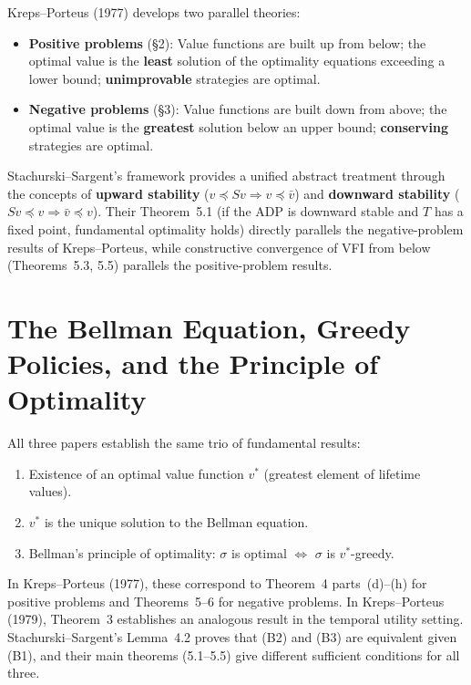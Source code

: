 \documentclass[12pt]{article}
\begin{document}
Kreps--Porteus (1977) develops two parallel theories:
\begin{itemize}
\item \textbf{Positive problems} (\S2): Value functions are built up from below; the optimal value is the \textbf{least} solution of the optimality equations exceeding a lower bound; \textbf{unimprovable} strategies are optimal.

\item \textbf{Negative problems} (\S3): Value functions are built down from above; the optimal value is the \textbf{greatest} solution below an upper bound; \textbf{conserving} strategies are optimal.
\end{itemize}

\noindent
Stachurski--Sargent's framework provides a unified abstract treatment through the concepts of \textbf{upward stability} ($v \preceq Sv \Rightarrow v \preceq \bar{v}$) and \textbf{downward stability} ($Sv \preceq v \Rightarrow \bar{v} \preceq v$). Their Theorem~5.1 (if the ADP is downward stable and $T$ has a fixed point, fundamental optimality holds) directly parallels the negative-problem results of Kreps--Porteus, while constructive convergence of VFI from below (Theorems~5.3, 5.5) parallels the positive-problem results.


\section{The Bellman Equation, Greedy Policies, and the Principle of Optimality}

All three papers establish the same trio of fundamental results:
\begin{enumerate}
\item[\textbf{(B1)}] Existence of an optimal value function $v^*$ (greatest element of lifetime values).
\item[\textbf{(B2)}] $v^*$ is the unique solution to the Bellman equation.
\item[\textbf{(B3)}] Bellman's principle of optimality: $\sigma$ is optimal $\iff$ $\sigma$ is $v^*$-greedy.
\end{enumerate}

\noindent
In Kreps--Porteus (1977), these correspond to Theorem~4 parts~(d)--(h) for positive problems and Theorems~5--6 for negative problems. In Kreps--Porteus (1979), Theorem~3 establishes an analogous result in the temporal utility setting. Stachurski--Sargent's Lemma~4.2 proves that (B2) and (B3) are equivalent given (B1), and their main theorems (5.1--5.5) give different sufficient conditions for all three.
\end{document}
